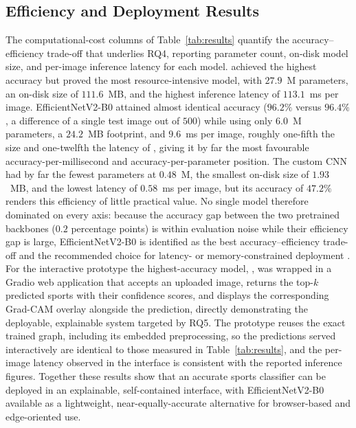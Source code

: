 \subsection{Efficiency and Deployment Results}
\label{subsec:res-efficiency}

The computational-cost columns of Table~\ref{tab:results} quantify the accuracy--efficiency trade-off that underlies RQ4, reporting parameter count, on-disk model size, and per-image inference latency for each model.
\bestModel{} achieved the highest accuracy but proved the most resource-intensive model, with $27.9$~M parameters, an on-disk size of $111.6$~MB, and the highest inference latency of $113.1$~ms per image.
EfficientNetV2-B0 attained almost identical accuracy ($96.2\%$ versus $96.4\%$, a difference of a single test image out of $500$) while using only $6.0$~M parameters, a $24.2$~MB footprint, and $9.6$~ms per image, roughly one-fifth the size and one-twelfth the latency of \bestModel{}, giving it by far the most favourable accuracy-per-millisecond and accuracy-per-parameter position.
The custom CNN had by far the fewest parameters at $0.48$~M, the smallest on-disk size of $1.93$~MB, and the lowest latency of $0.58$~ms per image, but its accuracy of $47.2\%$ renders this efficiency of little practical value.
No single model therefore dominated on every axis: because the accuracy gap between the two pretrained backbones ($0.2$ percentage points) is within evaluation noise while their efficiency gap is large, EfficientNetV2-B0 is identified as the best accuracy--efficiency trade-off and the recommended choice for latency- or memory-constrained deployment \citep{isong2025lightweight}.
For the interactive prototype the highest-accuracy model, \bestModel{}, was wrapped in a Gradio web application that accepts an uploaded image, returns the top-$k$ predicted sports with their confidence scores, and displays the corresponding Grad-CAM overlay alongside the prediction, directly demonstrating the deployable, explainable system targeted by RQ5.
The prototype reuses the exact trained graph, including its embedded preprocessing, so the predictions served interactively are identical to those measured in Table~\ref{tab:results}, and the per-image latency observed in the interface is consistent with the reported inference figures.
Together these results show that an accurate sports classifier can be deployed in an explainable, self-contained interface, with EfficientNetV2-B0 available as a lightweight, near-equally-accurate alternative for browser-based and edge-oriented use.

